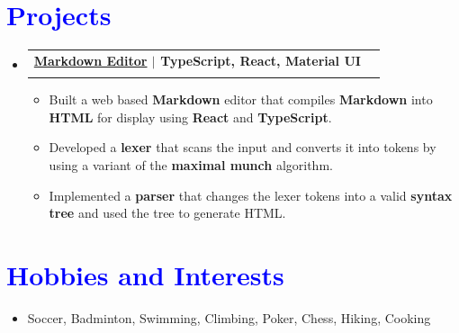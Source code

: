 \documentclass[letterpaper,11pt]{article}
\makeatletter
\newcommand{\resumeItem}[1]{
  \item\small{
    {#1 \vspace{-3pt}}
  }
}
\newcommand{\resumeSubheading}[4]{
  \vspace{-2pt}\item
    \begin{tabular*}{1.0\textwidth}[t]{l@{\extracolsep{\fill}}r}
      \textbf{#1} & \textbf{\small #2} \\
      \textit{\small#3} & \textit{\small #4} \\
    \end{tabular*}\vspace{-7pt}
}
\newcommand{\resumeSubHeadingListStart}{\begin{itemize}[leftmargin=0.0in, label={}]}
\newcommand{\resumeSubHeadingListEnd}{\end{itemize}}
\newcommand{\resumeItemListStart}{\begin{itemize}[leftmargin=0.2in]}
\newcommand{\resumeItemListEnd}{\end{itemize}\vspace{-5pt}}
\makeatother
\begin{document}
\section{\textcolor{Blue}{Projects}}
  \resumeSubHeadingListStart


    
    \resumeSubheading
      {{\href{https://markdown.torychen.com}{\textcolor{NavyBlue}{Markdown Editor}\faGithub}} $|$ \textnormal{TypeScript, React, Material UI}}{}
      {}{}
      \vspace{-16pt}
      \resumeItemListStart
        \resumeItem{Built a web based \textbf{Markdown} editor that compiles \textbf{Markdown} into \textbf{HTML} for display using \textbf{React} and \textbf{TypeScript}.}
        \resumeItem{Developed a \textbf{lexer} that scans the input and converts it into tokens by using a variant of the \textbf{maximal munch} algorithm.}
        \resumeItem{Implemented a \textbf{parser} that changes the lexer tokens into a valid \textbf{syntax tree} and used the tree to generate HTML.}
    \resumeItemListEnd
    
  \resumeSubHeadingListEnd
\vspace{-15pt}


\section{\textcolor{Blue}{Hobbies and Interests}}
  \resumeItemListStart
    \resumeItem{Soccer, Badminton, Swimming, Climbing, Poker, Chess, Hiking, Cooking}
  \resumeItemListEnd
\end{document}
